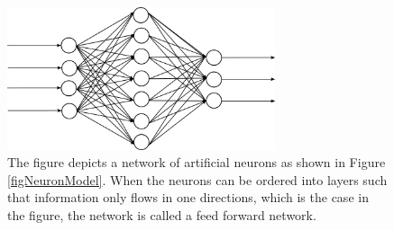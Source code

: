 \begin{figure}[h!]
  \centering
  \includegraphics[width=0.7\textwidth]{fig/feedforward.png}
  \caption{
    The figure depicts a network of artificial neurons as shown in Figure
    \ref{figNeuronModel}.
    When the neurons can be ordered into layers such that information only flows
    in one directions, which is the case in the figure, the network is called a
    feed forward network.
  }
  \label{figFFANN}
\end{figure}
